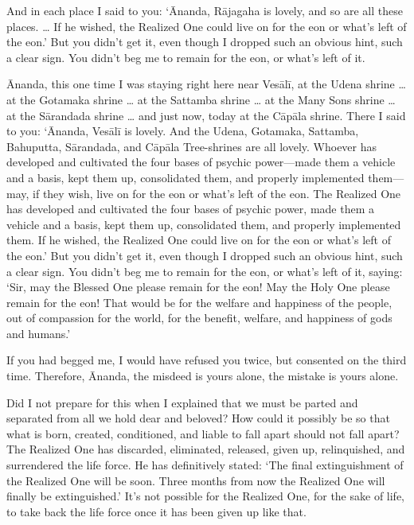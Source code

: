 \documentclass[12pt,openany]{book}%
\begin{document}
And in each place I said to you: ‘Ānanda, \textsanskrit{Rājagaha} is lovely, and so are all these places. … If he wished, the Realized One could live on for the eon or what’s left of the eon.’ But you didn’t get it, even though I dropped such an obvious hint, such a clear sign. You didn’t beg me to remain for the eon, or what’s left of it. 

Ānanda, this one time I was staying right here near \textsanskrit{Vesālī}, at the Udena shrine … at the Gotamaka shrine … at the Sattamba shrine … at the Many Sons shrine … at the \textsanskrit{Sārandada} shrine … and just now, today at the \textsanskrit{Cāpāla} shrine. There I said to you: ‘Ānanda, \textsanskrit{Vesālī} is lovely. And the Udena, Gotamaka, Sattamba, Bahuputta, \textsanskrit{Sārandada}, and \textsanskrit{Cāpāla} Tree-shrines are all lovely. Whoever has developed and cultivated the four bases of psychic power—made them a vehicle and a basis, kept them up, consolidated them, and properly implemented them—may, if they wish, live on for the eon or what’s left of the eon. The Realized One has developed and cultivated the four bases of psychic power, made them a vehicle and a basis, kept them up, consolidated them, and properly implemented them. If he wished, the Realized One could live on for the eon or what’s left of the eon.’ But you didn’t get it, even though I dropped such an obvious hint, such a clear sign. You didn’t beg me to remain for the eon, or what’s left of it, saying: ‘Sir, may the Blessed One please remain for the eon! May the Holy One please remain for the eon! That would be for the welfare and happiness of the people, out of compassion for the world, for the benefit, welfare, and happiness of gods and humans.’ 

If you had begged me, I would have refused you twice, but consented on the third time. Therefore, Ānanda, the misdeed is yours alone, the mistake is yours alone. 

Did I not prepare for this when I explained that we must be parted and separated from all we hold dear and beloved? How could it possibly be so that what is born, created, conditioned, and liable to fall apart should not fall apart? The Realized One has discarded, eliminated, released, given up, relinquished, and surrendered the life force. He has definitively stated: ‘The final extinguishment of the Realized One will be soon. Three months from now the Realized One will finally be extinguished.’ It’s not possible for the Realized One, for the sake of life, to take back the life force once it has been given up like that. 
\end{document}
